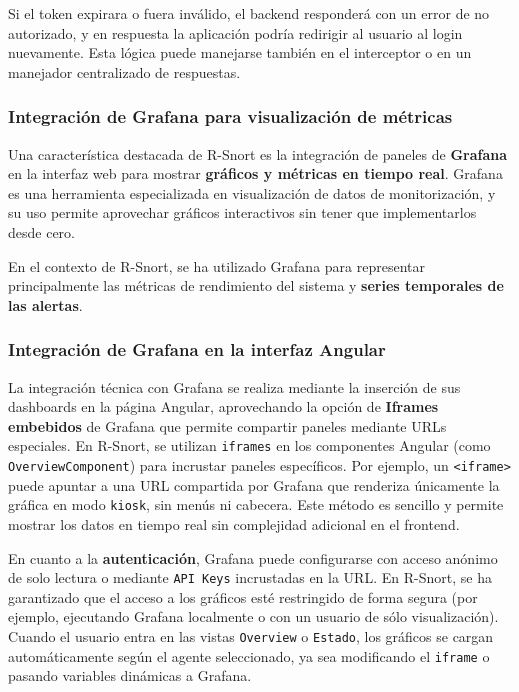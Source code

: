 \documentclass[11pt,a4paper,twoside]{report}
\begin{document}
Si el token expirara o fuera inválido, el backend responderá con un error de no autorizado, y en respuesta la aplicación podría redirigir al usuario al login nuevamente. Esta lógica puede manejarse también en el interceptor o en un manejador centralizado de respuestas.

\subsubsection{Integración de Grafana para visualización de métricas}

Una característica destacada de R-Snort es la integración de paneles de \textbf{Grafana} en la interfaz web para mostrar \textbf{gráficos y métricas en tiempo real}. Grafana es una herramienta especializada en visualización de datos de monitorización, y su uso permite aprovechar gráficos interactivos sin tener que implementarlos desde cero.\newline

En el contexto de R-Snort, se ha utilizado Grafana para representar principalmente las métricas de rendimiento del sistema y \textbf{series temporales de las alertas}.

\subsubsection{Integración de Grafana en la interfaz Angular}

La integración técnica con Grafana se realiza mediante la inserción de sus dashboards en la página Angular, aprovechando la opción de \textbf{Iframes embebidos} de Grafana que permite compartir paneles mediante URLs especiales. En R-Snort, se utilizan \texttt{iframes} en los componentes Angular (como \texttt{OverviewComponent}) para incrustar paneles específicos. Por ejemplo, un \texttt{<iframe>} puede apuntar a una URL compartida por Grafana que renderiza únicamente la gráfica en modo \texttt{kiosk}, sin menús ni cabecera. Este método es sencillo y permite mostrar los datos en tiempo real sin complejidad adicional en el frontend.\newline

En cuanto a la \textbf{autenticación}, Grafana puede configurarse con acceso anónimo de solo lectura o mediante \texttt{API Keys} incrustadas en la URL. En R-Snort, se ha garantizado que el acceso a los gráficos esté restringido de forma segura (por ejemplo, ejecutando Grafana localmente o con un usuario de sólo visualización). Cuando el usuario entra en las vistas \texttt{Overview} o \texttt{Estado}, los gráficos se cargan automáticamente según el agente seleccionado, ya sea modificando el \texttt{iframe} o pasando variables dinámicas a Grafana.\newline
\end{document}

